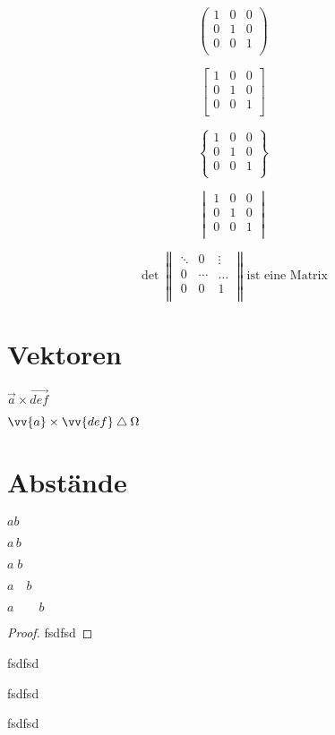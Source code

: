 \[%
\begin{pmatrix} 
1 & 0 & 0 \\ 
0 & 1 & 0 \\ 
0 & 0 & 1 \\ 
\end{pmatrix}
\]

\[%
\begin{bmatrix} 
1 & 0 & 0 \\ 
0 & 1 & 0 \\ 
0 & 0 & 1 \\ 
\end{bmatrix}
\]

\[%
\begin{Bmatrix} 
1 & 0 & 0 \\ 
0 & 1 & 0 \\ 
0 & 0 & 1 \\ 
\end{Bmatrix}
\]


\[%
\begin{vmatrix} 
1 & 0 & 0 \\ 
0 & 1 & 0 \\ 
0 & 0 & 1 \\ 
\end{vmatrix}
\]

\[%
\det 
\begin{Vmatrix} 
\ddots  & 0 & \vdots \\ 
0 & \cdots & \dots \\ 
0 & 0 & 1 \\ 
\end{Vmatrix}
\text{ist eine Matrix}
\]

\section{Vektoren}

\( \vec{a} \times \vec{def} \)

\( \vv{a} \times \vv{def} \bigtriangleup \Omega  \)

\section{Abstände}

\( ab \) %

\(a\,b \)

\(a\;b\)

\(a\quad b\)

\(a\qquad b\)


\begin{proof}
fsdfsd
\end{proof}

\begin{theorem}
fsdfsd
\end{theorem}

\begin{lemma}
fsdfsd
\end{lemma}

\begin{corollary}
fsdfsd
\end{corollary}